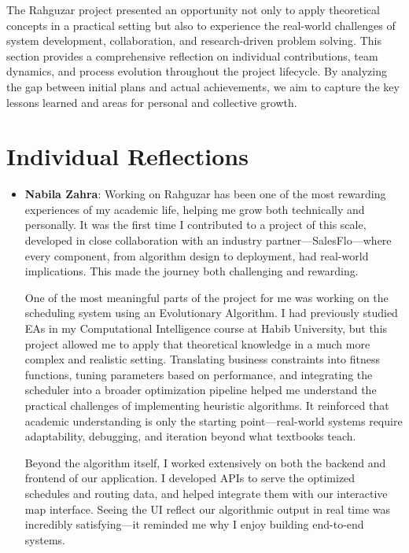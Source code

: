 The Rahguzar project presented an opportunity not only to apply theoretical concepts in a practical setting but also to experience the real-world challenges of system development, collaboration, and research-driven problem solving. This section provides a comprehensive reflection on individual contributions, team dynamics, and process evolution throughout the project lifecycle. By analyzing the gap between initial plans and actual achievements, we aim to capture the key lessons learned and areas for personal and collective growth.

\section{Individual Reflections}

\begin{itemize}
    \item \textbf{Nabila Zahra}: Working on Rahguzar has been one of the most rewarding experiences of my academic life, helping me grow both technically and personally. It was the first time I contributed to a project of this scale, developed in close collaboration with an industry partner—SalesFlo—where every component, from algorithm design to deployment, had real-world implications. This made the journey both challenging and rewarding.

    One of the most meaningful parts of the project for me was working on the scheduling system using an Evolutionary Algorithm. I had previously studied EAs in my Computational Intelligence course at Habib University, but this project allowed me to apply that theoretical knowledge in a much more complex and realistic setting. Translating business constraints into fitness functions, tuning parameters based on performance, and integrating the scheduler into a broader optimization pipeline helped me understand the practical challenges of implementing heuristic algorithms. It reinforced that academic understanding is only the starting point—real-world systems require adaptability, debugging, and iteration beyond what textbooks teach.
    
    Beyond the algorithm itself, I worked extensively on both the backend and frontend of our application. I developed APIs to serve the optimized schedules and routing data, and helped integrate them with our interactive map interface. Seeing the UI reflect our algorithmic output in real time was incredibly satisfying—it reminded me why I enjoy building end-to-end systems.
    

\end{itemize}

